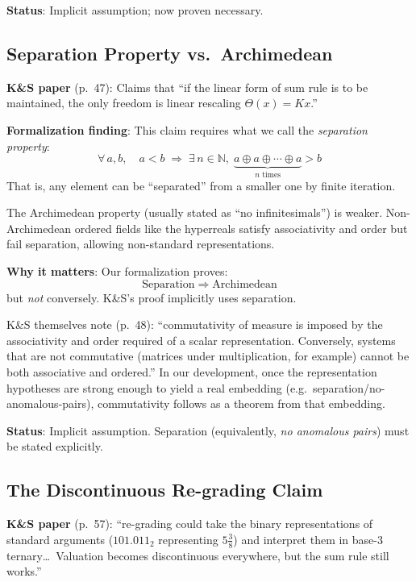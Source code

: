 \documentclass[11pt]{article}
\begin{document}
\textbf{Status}: Implicit assumption; now proven necessary.

\subsection{Separation Property vs.\ Archimedean}

\textbf{K\&S paper} (p.~47): Claims that ``if the linear form of sum rule is to be
maintained, the only freedom is linear rescaling $\Theta(x) = Kx$.''

\textbf{Formalization finding}: This claim requires what we call the \emph{separation property}:
\[
\forall\, a, b,\quad a < b \;\Longrightarrow\; \exists\, n \in \mathbb{N},\;
\underbrace{a \oplus a \oplus \cdots \oplus a}_{n \text{ times}} > b
\]
That is, any element can be ``separated'' from a smaller one by finite iteration.

The Archimedean property (usually stated as ``no infinitesimals'') is weaker.
Non-Archimedean ordered fields like the hyperreals satisfy associativity and order
but fail separation, allowing non-standard representations.

\textbf{Why it matters}: Our formalization proves:
\[
\text{Separation} \;\Longrightarrow\; \text{Archimedean}
\]
but \emph{not} conversely. K\&S's proof implicitly uses separation.

K\&S themselves note (p.~48): ``commutativity of measure is imposed by the associativity
and order required of a scalar representation. Conversely, systems that are not
commutative (matrices under multiplication, for example) cannot be both associative
and ordered.'' In our development, once the representation hypotheses are strong enough to yield
a real embedding (e.g.\ separation/no-anomalous-pairs), commutativity follows as a theorem from that
embedding.

\textbf{Status}: Implicit assumption. Separation (equivalently, \emph{no anomalous pairs})
must be stated explicitly.

\subsection{The Discontinuous Re-grading Claim}

\textbf{K\&S paper} (p.~57): ``re-grading could take the binary representations of
standard arguments ($101.011_2$ representing $5\frac{3}{8}$) and interpret them in
base-3 ternary\ldots\ Valuation becomes discontinuous everywhere, but the sum rule
still works.''
\end{document}
